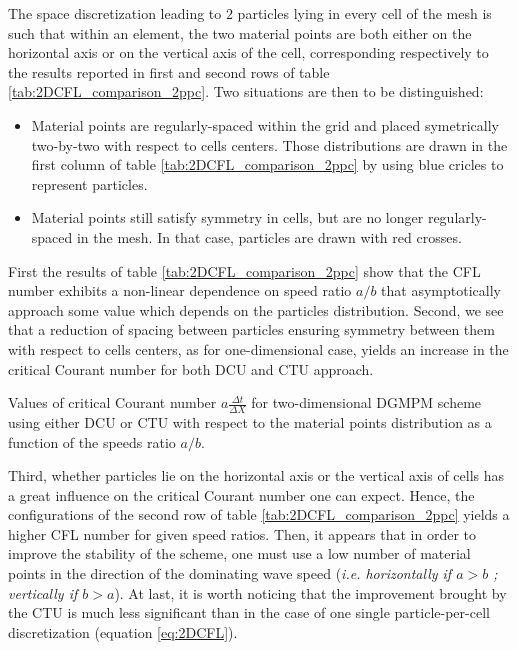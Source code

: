 The space discretization leading to $2$ particles lying in every cell of the mesh is such that within an element, the two material points are both either on the horizontal axis or on the vertical axis of the cell, corresponding respectively to the results reported in first and second rows of table \ref{tab:2DCFL_comparison_2ppc}. Two situations are then to be distinguished:
\begin{itemize}
\item Material points are regularly-spaced within the grid and placed symetrically two-by-two with respect to cells centers. Those distributions are drawn in the first column of table \ref{tab:2DCFL_comparison_2ppc} by using blue cricles to represent particles.
\item Material points still satisfy symmetry in cells, but are no longer regularly-spaced in the mesh. In that case, particles are drawn with red crosses.
\end{itemize}
First the results of table \ref{tab:2DCFL_comparison_2ppc} show that the CFL number exhibits a non-linear dependence on speed ratio $a/b$ that asymptotically approach some value which depends on the particles distribution. Second, we see that a reduction of spacing between particles ensuring symmetry between them with respect to cells centers, as for one-dimensional case, yields an increase in the critical Courant number for both DCU and CTU approach. 
\begin{table}[h]
  \centering
  
  \caption{Values of critical Courant number $a\frac{\Delta t}{\Delta X}$ for two-dimensional DGMPM scheme using either DCU or CTU with respect to the material points distribution as a function of the speeds ratio $a/b$.}
  \label{tab:2DCFL_comparison_4ppc}
\end{table}
Third, whether particles lie on the horizontal axis or the vertical axis of cells has a great influence on the critical Courant number one can expect. Hence, the configurations of the second row of table \ref{tab:2DCFL_comparison_2ppc} yields a higher CFL number for given speed ratios. Then, it appears that in order to improve the stability of the scheme, one must use a low number of material points in the direction of the dominating wave speed (\textit{i.e. horizontally if $a>b$ ; vertically if $b>a$}).  
At last, it is worth noticing that the improvement brought by the CTU is much less significant than in the case of one single particle-per-cell discretization (equation \eqref{eq:2DCFL}).

